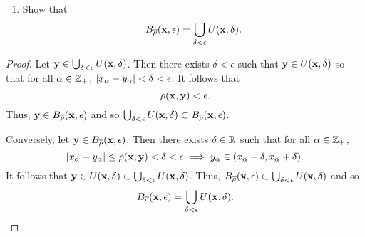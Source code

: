 \begin{solution}
  \begin{enumerate}[label={(\alph*)}, align=left, leftmargin=\parindent, listparindent=\parindent, labelwidth=0pt, itemindent=!]
    \addtocounter{enumi}{2} 
    \item Show that
      \begin{equation*}
        B_{\overline{\rho}}(\mathbf{x}, \epsilon) = \bigcup_{\delta < \epsilon} U(\mathbf{x}, \delta).
      \end{equation*}
  \end{enumerate}
  \begin{proof}
    Let $\mathbf{y} \in \bigcup_{\delta < \epsilon} U(\mathbf{x}, \delta)$.
    Then there exists $\delta < \epsilon$ such that $\mathbf{y} \in U(\mathbf{x}, \delta)$ so that for all $\alpha \in \mathbb{Z}_+$, $\left| x_\alpha - y_\alpha \right| < \delta < \epsilon$.
    It follows that
    \begin{equation*}
      \overline{\rho}(\mathbf{x}, \mathbf{y}) < \epsilon.
    \end{equation*}
    Thus, $\mathbf{y} \in B_{\overline{\rho}}(\mathbf{x}, \epsilon)$ and so $\bigcup_{\delta < \epsilon} U(\mathbf{x}, \delta) \subset B_{\overline{\rho}}(\mathbf{x}, \epsilon)$.

    Conversely, let $\mathbf{y} \in B_{\overline{\rho}}(\mathbf{x}, \epsilon)$.
    Then there exists $\delta \in \mathbb{R}$ such that for all $\alpha \in \mathbb{Z}_+$,
    \begin{equation*}
      \left| x_\alpha - y_\alpha \right| \leq \overline{\rho}(\mathbf{x}, \mathbf{y}) < \delta < \epsilon \implies y_\alpha \in (x_\alpha - \delta, x_\alpha + \delta).
    \end{equation*}
    It follows that $\mathbf{y} \in U(\mathbf{x}, \delta) \subset \bigcup_{\delta < \epsilon} U(\mathbf{x}, \delta)$.
    Thus, $B_{\overline{\rho}}(\mathbf{x}, \epsilon) \subset \bigcup_{\delta < \epsilon} U(\mathbf{x}, \delta)$ and so
    \begin{equation*}
      B_{\overline{\rho}}(\mathbf{x}, \epsilon) = \bigcup_{\delta < \epsilon} U(\mathbf{x}, \delta).
    \end{equation*}
  \end{proof}
\end{solution}

